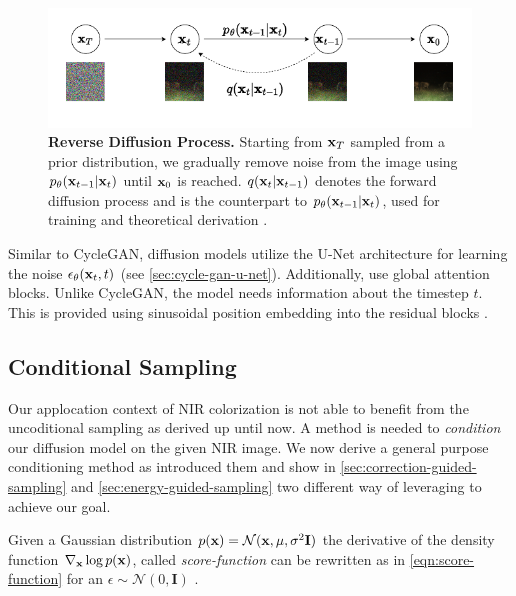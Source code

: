 \begin{figure}[htp!]
   \centering
   \includegraphics[width=.8\textwidth]{gfx/Unconditional-Sampling.pdf}
   \caption{
      \textbf{Reverse Diffusion Process.}
      Starting from $\mathbf{x}_T$ sampled from a prior distribution, we gradually remove noise from the image using $p_\theta(\mathbf{x}_{t-1}|\mathbf{x}_t)$ until $\mathbf{x}_0$ is reached.
      $q(\mathbf{x}_t | \mathbf{x}_{t-1})$ denotes the forward diffusion process and is the counterpart to $p_\theta(\mathbf{x}_{t-1}|\mathbf{x}_t)$, used for training and theoretical derivation \parencite{ddpm}.
   }
   \label{fig:reverse-diffusion-process}
\end{figure}



Similar to CycleGAN, diffusion models utilize the U-Net architecture for learning the noise $\epsilon_\theta(\mathbf{x}_t,t)$ \parencite{unet,mehri,ddpm,diffusion-beats-gans} (see \autoref{sec:cycle-gan-u-net}).
Additionally, \cite{diffusion-beats-gans} use global attention blocks.  
Unlike CycleGAN, the model needs information about the timestep $t$. This is provided using sinusoidal position embedding into the residual blocks \parencite{ddpm}.

\subsection{Conditional Sampling}
\label{sec:conditional-sampling}
Our applocation context of NIR colorization is not able to benefit from the uncoditional sampling as derived up until now.
A method is needed to \textit{condition} our diffusion model on the given NIR image.
We now derive a general purpose conditioning method as \textcite{sbgm,diffusion-beats-gans} introduced them and show in \autoref{sec:correction-guided-sampling} and \autoref{sec:energy-guided-sampling}
two different way of leveraging to achieve our goal.

Given a Gaussian distribution $p(\mathbf{x}) = \mathcal{N}(\mathbf{x}, \mu, \sigma^2 \mathbf{I})$ the derivative of the density function $\nabla_{\mathbf{x}} \log p(\mathbf{x})$, called \textit{score-function} can be rewritten as in \autoref{eqn:score-function} for an $\epsilon \sim \mathcal{N}(0, \mathbf{I})$ \parencite{sbgm}.

